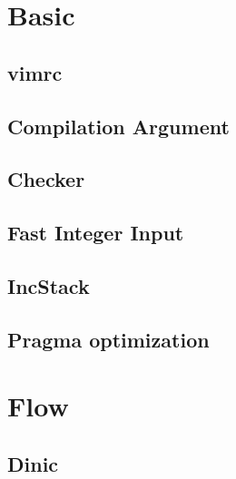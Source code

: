 \documentclass[a4paper,10pt,twocolumn,oneside]{article}
\begin{document}
\pagestyle{fancy}
\fancyfoot{}
\fancyhead[R]{\thepage}
\renewcommand{\headrulewidth}{0.4pt}
\renewcommand{\contentsname}{Contents} 

\scriptsize
\tableofcontents
\newpage
%
\section{Basic}
\subsection{vimrc}

\subsection{Compilation Argument}

\subsection{Checker}

\subsection{Fast Integer Input}

\subsection{IncStack}

\subsection{Pragma optimization}

\section{Flow}
\subsection{Dinic}

\end{document}
